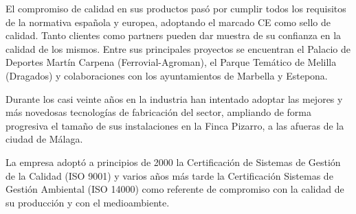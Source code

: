 El compromiso de calidad en sus productos pasó por cumplir todos los requisitos de la normativa española y europea, adoptando el marcado CE como sello de calidad. Tanto clientes como partners pueden dar muestra de su confianza en la calidad de los mismos. Entre sus principales proyectos se encuentran el Palacio de Deportes Martín Carpena (Ferrovial-Agroman), el Parque Temático de Melilla (Dragados) y colaboraciones con los ayuntamientos de Marbella y Estepona.

Durante los casi veinte años en la industria han intentado adoptar las mejores y más novedosas tecnologías de fabricación del sector, ampliando de forma progresiva el tamaño de sus instalaciones en la Finca Pizarro, a las afueras de la ciudad de Málaga.

La empresa adoptó a principios de 2000 la Certificación de Sistemas de Gestión de la Calidad (ISO 9001) y varios años más tarde la Certificación Sistemas de Gestión Ambiental (ISO 14000) como referente de compromiso con la calidad de su producción y con el medioambiente.
